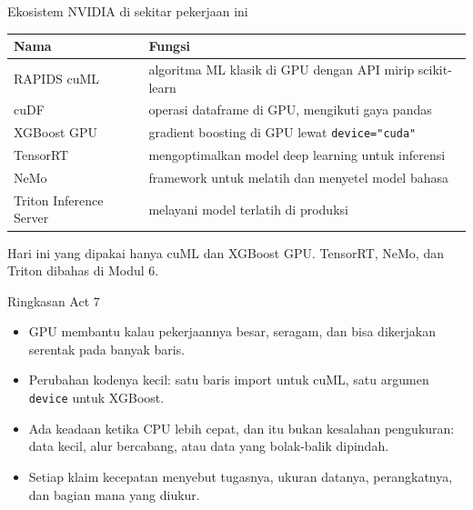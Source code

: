 \documentclass[aspectratio=169,t]{beamer}
\begin{document}
\begin{frame}{Ekosistem NVIDIA di sekitar pekerjaan ini}
  \vspace{0.3em}
  \begin{center}
  {\footnotesize\renewcommand{\arraystretch}{1.15}
  \begin{tabular}{@{}>{\raggedright\arraybackslash}p{4.0cm}>{\raggedright\arraybackslash}p{7.4cm}@{}}
    \toprule
    \rowcolor{nvcard}\color{nvgreen}\textbf{Nama} &
    \color{nvgreen}\textbf{Fungsi} \\
    \midrule
    RAPIDS cuML & algoritma ML klasik di GPU dengan API mirip scikit-learn \\
    \rowcolor{nvcard!60!nvbg} cuDF & operasi dataframe di GPU, mengikuti gaya pandas \\
    XGBoost GPU & gradient boosting di GPU lewat \texttt{device="cuda"} \\
    \rowcolor{nvcard!60!nvbg} TensorRT & mengoptimalkan model deep learning untuk inferensi \\
    NeMo & framework untuk melatih dan menyetel model bahasa \\
    \rowcolor{nvcard!60!nvbg} Triton Inference Server & melayani model terlatih di produksi \\
    \bottomrule
  \end{tabular}}
  \end{center}
  \vspace{0.2em}
  {\footnotesize\color{nvgray}Hari ini yang dipakai hanya cuML dan XGBoost GPU. TensorRT, NeMo,
  dan Triton dibahas di Modul 6.}
\end{frame}

\begin{frame}{Ringkasan Act 7}
  \vspace{0.6em}
  \begin{itemize}\setlength\itemsep{0.55em}
    \item GPU membantu kalau pekerjaannya besar, seragam, dan bisa dikerjakan serentak pada
          banyak baris.
    \item Perubahan kodenya kecil: satu baris import untuk cuML, satu argumen \texttt{device}
          untuk XGBoost.
    \item Ada keadaan ketika CPU lebih cepat, dan itu bukan kesalahan pengukuran: data kecil,
          alur bercabang, atau data yang bolak-balik dipindah.
    \item Setiap klaim kecepatan menyebut tugasnya, ukuran datanya, perangkatnya, dan bagian
          mana yang diukur.
  \end{itemize}
\end{frame}
\end{document}
